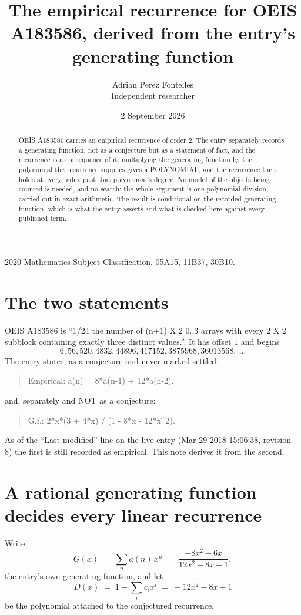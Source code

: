 \documentclass[11pt,a4paper]{article}
\title{The empirical recurrence for OEIS A183586, derived from the entry's generating function}
\author{Adrian Perez Fontelles\\ \small Independent researcher}
\date{2 September 2026}
\theoremstyle{plain}
\theoremstyle{definition}
\begin{document}
\maketitle

\begin{abstract}
OEIS A183586 carries an empirical recurrence of order $2$. The entry separately records a
generating function, not as a conjecture but as a statement of fact, and the recurrence is a
consequence of it: multiplying the generating function by the polynomial the recurrence
supplies gives a POLYNOMIAL, and the recurrence then holds at every index past that
polynomial's degree. No model of the objects being counted is needed, and no search: the
whole argument is one polynomial division, carried out in exact arithmetic. The result is
conditional on the recorded generating function, which is what the entry asserts and what is
checked here against every published term.
\end{abstract}

\noindent\small 2020 Mathematics Subject Classification. 05A15, 11B37, 30B10.\normalsize

\section{The two statements}

OEIS A183586 is ``1/24 the number of (n+1) X 2 0..3 arrays with every 2 X 2 subblock containing exactly three distinct values.''. It has offset $1$ and begins
\[
6, 56, 520, 4832, 44896, 417152, 3875968, 36013568,\ \dots
\]
The entry states, as a conjecture and never marked settled:
\begin{quote}
Empirical: a(n) = 8*a(n-1) + 12*a(n-2).
\end{quote}
and, separately and NOT as a conjecture:
\begin{quote}
G.f.: 2*x*(3 + 4*x) / (1 - 8*x - 12*x\^{}2).
\end{quote}
As of the ``Last modified'' line on the live entry (Mar 29 2018 15:06:38, revision 8) the first is still
recorded as empirical. This note derives it from the second.

\section{A rational generating function decides every linear recurrence}

Write
\[
G(x)\;=\;\sum_{n}a(n)\,x^{n}\;=\;\frac{- 8 x^{2} - 6 x}{12 x^{2} + 8 x - 1},
\]
the entry's own generating function, and let
\[
D(x)\;=\;1-\sum_i c_i x^{i}\;=\;- 12 x^{2} - 8 x + 1
\]
be the polynomial attached to the conjectured recurrence.
\end{document}
